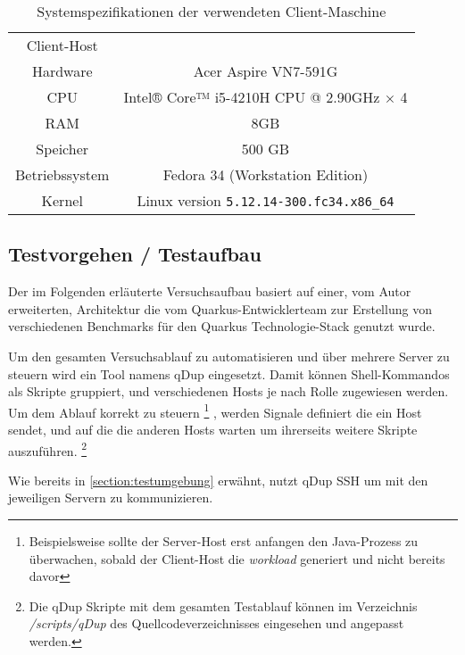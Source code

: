 \begin{table}[ht!]
    \centering
    \begin{tabular}{| c | c |}
        \hline
        Client-Host                                               \\
        Hardware       & Acer Aspire VN7-591G                     \\
        \hline
        CPU            & Intel® Core™ i5-4210H CPU @ 2.90GHz × 4  \\
        \hline
        RAM            & 8GB                                      \\
        \hline
        Speicher       & 500 GB                                   \\
        \hline
        Betriebssystem & Fedora 34 (Workstation Edition)          \\
        \hline
        Kernel         & Linux version \verb|5.12.14-300.fc34.x86_64| \\
        \hline
    \end{tabular}
    \caption{Systemspezifikationen der verwendeten Client-Maschine}
    \label{table:system_client}
\end{table}

\subsection{Testvorgehen / Testaufbau}
\label{section:vorgehen}
Der im Folgenden erläuterte Versuchsaufbau basiert auf einer, vom Autor erweiterten, Architektur die vom Quarkus-Entwicklerteam
zur Erstellung von verschiedenen Benchmarks für den Quarkus Technologie-Stack genutzt wurde.
\cite{QuarkusBlog, QuarkusJohnaohara}

Um den gesamten Versuchsablauf zu automatisieren und über mehrere Server zu steuern wird ein Tool namens qDup eingesetzt.
Damit können Shell-Kommandos als Skripte gruppiert, und verschiedenen Hosts je nach Rolle zugewiesen werden.
Um dem Ablauf korrekt zu steuern
\footnote{Beispielsweise sollte der Server-Host erst anfangen den Java-Prozess zu überwachen, sobald der Client-Host die \textit{workload}
    generiert und nicht bereits davor}
, werden Signale definiert die ein Host sendet, und auf die die anderen Hosts warten um ihrerseits
weitere Skripte auszuführen.
\footnote{Die qDup Skripte mit dem gesamten Testablauf können im Verzeichnis \textit{/scripts/qDup} des Quellcodeverzeichnisses eingesehen und
    angepasst werden.}

Wie bereits in \ref{section:testumgebung} erwähnt, nutzt qDup SSH um mit den jeweiligen Servern zu kommunizieren.


